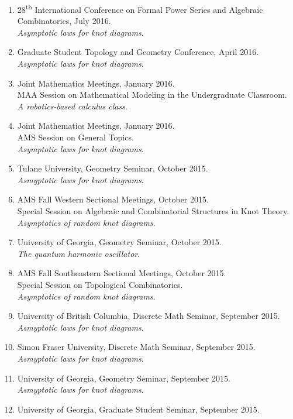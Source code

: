 \documentclass[letterpaper]{article}
\begin{document}
\begin{enumerate}
\item 28\textsuperscript{th} International Conference on Formal Power Series and
  Algebraic Combinatorics, July 2016.\\
  \textit{Asymptotic laws for knot diagrams}.
\item Graduate Student Topology and Geometry Conference, April 2016.\\
  \textit{Asymptotic laws for knot diagrams}.
\item Joint Mathematics Meetings, January 2016.\\
  MAA Session on Mathematical Modeling in the Undergraduate Classroom. \\
  \textit{A robotics-based calculus class}.
\item Joint Mathematics Meetings, January 2016.\\
  AMS Session on General Topics. \\
  \textit{Asymptotic laws for knot diagrams}.
\item Tulane University, Geometry Seminar, October 2015.\\
  \textit{Asmyptotic laws for knot diagrams}.
\item AMS Fall Western Sectional Meetings, October 2015.\\
  Special Session on Algebraic and Combinatorial Structures in Knot Theory. \\
  \textit{Asymptotics of random knot diagrams}.
\item University of Georgia, Geometry Seminar, October 2015.\\
  \textit{The quantum harmonic oscillator}.
\item AMS Fall Southeastern Sectional Meetings, October 2015.\\
  Special Session on Topological Combinatorics. \\
  \textit{Asymptotics of random knot diagrams}.
\item University of British Columbia, Discrete Math Seminar, September 2015.\\
  \textit{Asmyptotic laws for knot diagrams}.
\item Simon Fraser University, Discrete Math Seminar, September 2015.\\
  \textit{Asmyptotic laws for knot diagrams}.
\item University of Georgia, Geometry Seminar, September 2015.\\
  \textit{Asmyptotic laws for knot diagrams}.
\item University of Georgia, Graduate Student Seminar, September 2015.\\

\end{enumerate}
\end{document}

